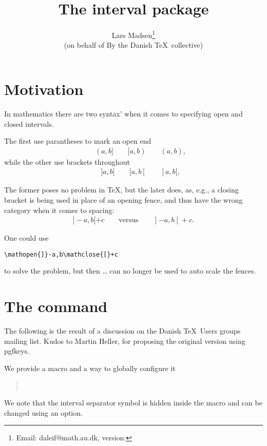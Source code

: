 \documentclass[a4paper,article]{memoir}
\title{The \textsf{interval} package}
\author{Lars Madsen\thanks{Email: daleif@math.au.dk, version: \INTVversion}\\ \small (on behalf of By the Danish \TeX\ collective)}
\begin{document}
\maketitle



\section{Motivation}
\label{sec:motivation}

In mathematics there are two syntax' when it comes to specifying open
and closed intervals.

The first use parantheses to mark an open end
\begin{align*}
  [a,b] \qquad (a,b] \qquad [a,b)\qquad (a,b),
\end{align*}
while the other use brackets throughout
\begin{align*}
  [a,b] \qquad ]a,b] \qquad [a,b[\qquad ]a,b[,
\end{align*}

The former poses no problem in \TeX, but the later does, as, e.g., a
closing bracket is being used in place of an opening fence, and thus
have the wrong category when it comes to spacing:
\begin{align*}
  ]-a,b[+c \qquad\text{versus}\qquad \mathopen{]}-a,b\mathclose{[}+c.
\end{align*}

One could use
\begin{verbatim}
\mathopen{]}-a,b\mathclose{[}+c
\end{verbatim}
to solve the problem, but then \dots{} can no longer
be used to auto scale the fences.




\section{The  command}
\label{sec:csinterval-command}

The following is the result of a discussion on the Danish \TeX\ Users
groups mailing list. Kudos to Martin Heller, for proposing the
original version using \textsf{pgfkeys}.

We provide a macro and a way to globally configure it
\begin{quote}
  \\
\end{quote}
We note that the interval separator symbol is hidden inside the
 macro and can be changed using an option.
\end{document}

